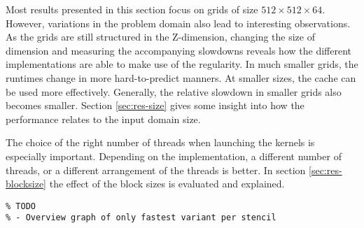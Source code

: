 Most results presented in this section focus on grids of size $512\times 512\times 64$. However, variations in the problem domain also lead to interesting observations. As the grids are still structured in the Z-dimension, changing the size of dimension and measuring the accompanying slowdowns reveals how the different implementations are able to make use of the regularity. In much smaller grids, the runtimes change in more hard-to-predict manners. At smaller sizes, the cache can be used more effectively. Generally, the relative slowdown in smaller grids also becomes smaller. Section \ref{sec:res-size} gives some insight into how the performance relates to the input domain size.

The choice of the right number of threads when launching the kernels is especially important. Depending on the implementation, a different number of threads, or a different arrangement of the threads is better. In section \ref{sec:res-blocksize} the effect of the block sizes is evaluated and explained.

\begin{verbatim}
% TODO 
% - Overview graph of only fastest variant per stencil
\end{verbatim}

